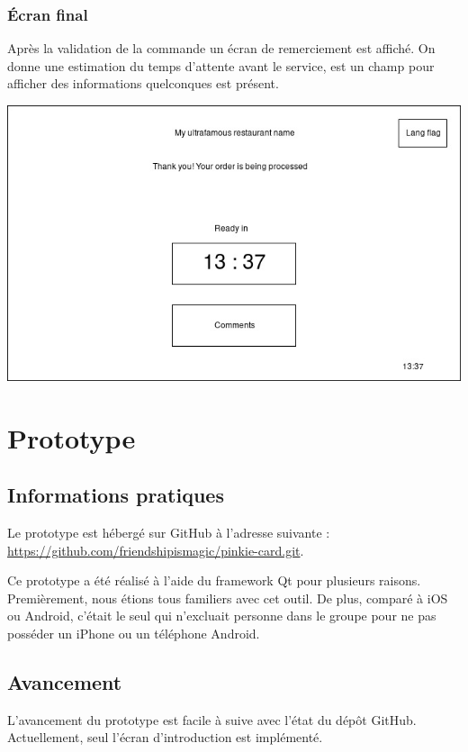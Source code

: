 \documentclass[a4paper,12pt]{article}
\begin{document}
\subsubsection{Écran final}

Après la validation de la commande un écran de remerciement est affiché. On donne une estimation du temps d'attente
avant le service, est un champ pour afficher des informations quelconques est présent.

\begin{center}
	\includegraphics[width=\textwidth]{final_screen.jpg}
\end{center}

\section{Prototype}

\subsection{Informations pratiques}

Le prototype est hébergé sur GitHub à l'adresse suivante : \\
\url{https://github.com/friendshipismagic/pinkie-card.git}.

Ce prototype a été réalisé à l'aide du framework Qt pour plusieurs raisons. Premièrement, nous étions tous familiers
avec cet outil. De plus, comparé à iOS ou Android, c'était le seul qui n'excluait personne dans le groupe pour ne pas
posséder un iPhone ou un téléphone Android.

\subsection{Avancement}

L'avancement du prototype est facile à suive avec l'état du dépôt GitHub. Actuellement, seul l'écran d'introduction
est implémenté.
\end{document}
